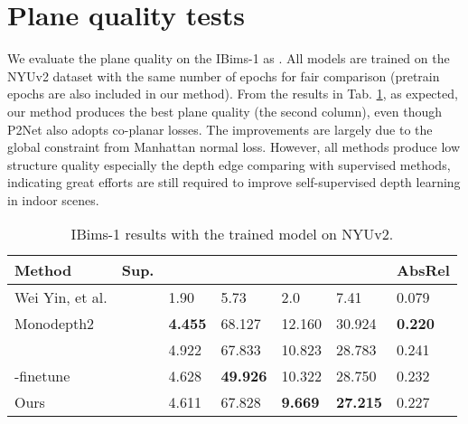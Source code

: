 \documentclass[10pt,twocolumn,letterpaper]{article}
\newcommand{\Tab}[1]{Tab. \ref{#1}}
\begin{document}
\section{Plane quality tests}
We evaluate the plane quality on the IBims-1\cite{koch2018evaluation} as \cite{yin2021learning}. All models are trained on the NYUv2 dataset with the same number of epochs for fair comparison (pretrain epochs are also included in our method). From the results in \Tab{tab:IBIMS}, as expected, our method produces the best plane quality (the second column), even though P2Net also adopts co-planar losses. The improvements are largely due to the global constraint from Manhattan normal loss. However, all methods produce low structure quality especially the depth edge comparing with supervised methods, indicating great efforts are still required to improve self-supervised depth learning in indoor scenes.
\begin{table}[h]
	\scriptsize                                                                                    
\centering
	\begin{tabularx}{0.48\textwidth}{|l|l|XX|XX|X|}
		\hline
		Method             &  Sup.    &   &   &  &  & AbsRel  \\ \hline
		Wei Yin, et al.\cite{yin2021learning} &       &  1.90         & 5.73  & 2.0  & 7.41        & 0.079 \\ \hline
		
		Monodepth2\cite{godard2019digging} &  &  \textbf{4.455} & 68.127         & 12.160           & 30.924  & \textbf{0.220}        \\ 
		\cite{yu2020p}  &  &  4.922 & 67.833         & 10.823          & 28.783         & 0.241 \\
		-finetune  &  &  4.628 & \textbf{49.926}         & 10.322           & 28.750         & 0.232 \\
		Ours        &   &  4.611         & 67.828  & \textbf{9.669}  & \textbf{27.215}        & 0.227 \\ \hline
	\end{tabularx}
	\newline
	\caption{IBims-1 results with the trained model on NYUv2.}
	\label{tab:IBIMS}
\end{table}
\end{document}

